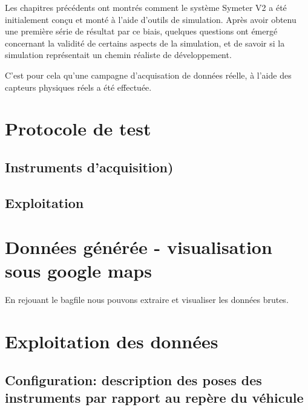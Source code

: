 \documentclass[12pt,a4paper]{report}
\begin{document}
Les chapitres précédents ont montrés comment le système Symeter V2 a été initialement conçu et monté à l'aide d'outils de simulation. Après avoir obtenu une première série de résultat par ce biais, quelques questions ont émergé concernant la validité de certains aspects de la simulation, et de savoir si la simulation représentait un chemin réaliste de développement.

\para C'est pour cela qu'une campagne d'acquisation de données réelle, à l'aide des capteurs physiques réels a été effectuée.


	\section{Protocole de test}
	\subsection{Instruments d'acquisition)}
	
	\subsection{Exploitation}
	
	\section{Données générée - visualisation sous google maps}
	En rejouant le bagfile nous pouvons extraire et visualiser les données brutes.
	
	\section{Exploitation des données}
	\subsection{Configuration: description des poses des instruments par rapport au repère du véhicule}
	
\end{document}
